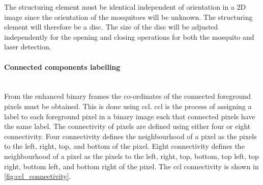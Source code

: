 The structuring element must be identical independent of orientation in a 2D image since the orientation of the mosquitoes will be unknown. The structuring element will therefore be a disc. The size of the disc will be adjusted independently for the opening and closing operations for both the mosquito and laser detection.


\paragraph{Connected components labelling}\label{par:ccl}\mbox{}\\
From the enhanced binary frames the co-ordinates of the connected foreground pixels must be obtained. This is done using \gls{ccl}. \Gls{ccl} is the process of assigning a label to each foreground pixel in a binary image such that connected pixels have the same label. The connectivity of pixels are defined using either four or eight connectivity. Four connectivity defines the neighbourhood of a pixel as the pixels to the left, right, top, and bottom of the pixel. Eight connectivity defines the neighbourhood of a pixel as the pixels to the left, right, top, bottom, top left, top right, bottom left, and bottom right of the pixel. The \gls{ccl} connectivity is shown in \autoref{fig:ccl_connectivity}.

